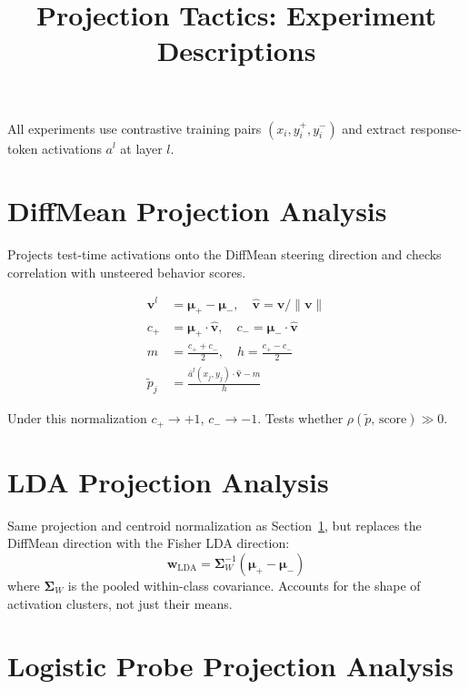 \documentclass[11pt]{article}
\title{Projection Tactics: Experiment Descriptions}
\author{}
\date{}
\begin{document}
\maketitle

\noindent All experiments use contrastive training pairs $(x_i, y_i^+, y_i^-)$ and extract response-token activations $a^l$ at layer $l$.

\section{DiffMean Projection Analysis}
\label{sec:diffmean}

Projects test-time activations onto the DiffMean steering direction and checks correlation with unsteered behavior scores.

\begin{align}
    \mathbf{v}^l &= \boldsymbol{\mu}_+ - \boldsymbol{\mu}_-, \quad \hat{\mathbf{v}} = \mathbf{v}/\|\mathbf{v}\| \\
    c_+ &= \boldsymbol{\mu}_+ \cdot \hat{\mathbf{v}}, \quad c_- = \boldsymbol{\mu}_- \cdot \hat{\mathbf{v}} \\
    m &= \tfrac{c_+ + c_-}{2}, \quad h = \tfrac{c_+ - c_-}{2} \\
    \tilde{p}_j &= \frac{\bar{a}^l(x_j, y_j) \cdot \hat{\mathbf{v}} - m}{h}
\end{align}

Under this normalization $c_+ \to +1$, $c_- \to -1$. Tests whether $\rho(\tilde{p},\, \text{score}) \gg 0$.

\section{LDA Projection Analysis}
\label{sec:lda}

Same projection and centroid normalization as Section~\ref{sec:diffmean}, but replaces the DiffMean direction with the Fisher LDA direction:
\begin{equation}
    \mathbf{w}_\text{LDA} = \boldsymbol{\Sigma}_W^{-1}(\boldsymbol{\mu}_+ - \boldsymbol{\mu}_-)
\end{equation}
where $\boldsymbol{\Sigma}_W$ is the pooled within-class covariance. Accounts for the shape of activation clusters, not just their means.

\section{Logistic Probe Projection Analysis}
\label{sec:probe}
\end{document}

